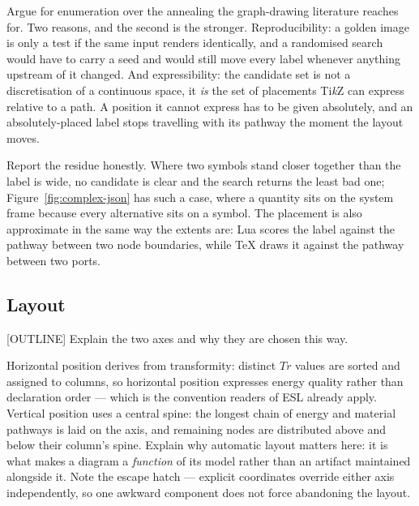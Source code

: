 Argue for enumeration over the annealing the graph-drawing literature reaches
for. Two reasons, and the second is the stronger. Reproducibility: a golden
image is only a test if the same input renders identically, and a randomised
search would have to carry a seed and would still move every label whenever
anything upstream of it changed. And expressibility: the candidate set is not a
discretisation of a continuous space, it \emph{is} the set of placements
Ti\emph{k}Z can express relative to a path. A position it cannot express has to
be given absolutely, and an absolutely-placed label stops travelling with its
pathway the moment the layout moves.

Report the residue honestly. Where two symbols stand closer together than the
label is wide, no candidate is clear and the search returns the least bad one;
Figure~\ref{fig:complex-json} has such a case, where a quantity sits on the
system frame because every alternative sits on a symbol. The placement is also
approximate in the same way the extents are: Lua scores the label against the
pathway between two node boundaries, while \TeX{} draws it against the pathway
between two ports.

\subsection{Layout}

[OUTLINE] Explain the two axes and why they are chosen this way.

Horizontal position derives from transformity: distinct $Tr$ values are sorted
and assigned to columns, so horizontal position expresses energy quality rather
than declaration order --- which is the convention readers of ESL already apply.
Vertical position uses a central spine: the longest chain of energy and material
pathways is laid on the axis, and remaining nodes are distributed above and
below their column's spine. Explain why automatic layout matters here: it is
what makes a diagram a \emph{function} of its model rather than an artifact
maintained alongside it. Note the escape hatch --- explicit coordinates override
either axis independently, so one awkward component does not force abandoning
the layout.

